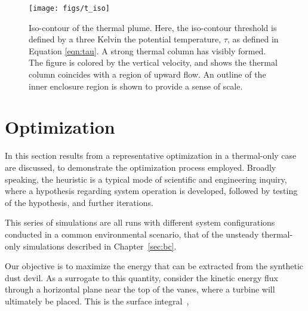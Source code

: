 %
%
  \begin{figure}[!htb]
   \begin{center}
    \texttt{[image: figs/t\_iso]}
    \caption{Iso-contour of the thermal plume. Here, the iso-contour
    threshold is defined by a three Kelvin the potential temperature,
    $\tau$, as defined in Equation \ref{eqn:tau}. A strong thermal
    column has visibly formed. The figure is colored by the vertical
    velocity, and shows the thermal column coincides with a region of
    upward flow. An outline of the inner enclosure region is shown to
    provide a sense of scale.} 
    \label{fig:field_real}
   \end{center}
  \end{figure}

\section{Optimization}
\label{sec:opt}

In this section results from a representative optimization
in a thermal-only case are discussed, to demonstrate the optimization  
process employed. Broadly speaking, the heuristic is a typical mode of
scientific and engineering inquiry, where a hypothesis regarding system
operation is developed, followed by testing of the hypothesis, and further
iterations.  

This series of simulations are all runs with different system
configurations conducted in a common environmental scenario, that of the
unsteady thermal-only simulations described in Chapter~\ref{sec:bc}. 

Our objective is to maximize the energy that can be 
extracted from the synthetic dust devil. As a surrogate to this
quantity, consider the kinetic energy flux through a horizontal plane
near the top of the vanes, where a turbine will ultimately be
placed. This is the surface integral~\cite{landau1959fm},

%
%
%




